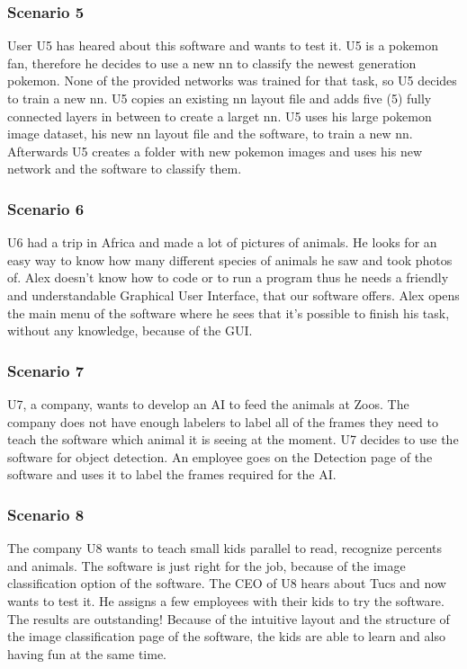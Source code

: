 \documentclass[parskip=full]{scrartcl}
\begin{document}
\subsubsection{Scenario 5}
User U5 has heared about this software and wants to test it.
U5 is a pokemon fan, therefore he decides to use a new \gls{nn} to classify the newest generation pokemon. None of the provided networks was trained for that task, so U5 decides to train a new \gls{nn}. U5 copies an existing \gls{nn} layout file and adds five (5) fully connected layers in between to create a larget \gls{nn}. U5 uses his large pokemon image dataset, his new \gls{nn} layout file and the software, to train a new \gls{nn}. 
Afterwards U5 creates a folder with new pokemon images and uses his new network and the software to classify them.
\subsubsection{Scenario 6}
U6 had a trip in Africa and made a lot of pictures of animals. He looks for an easy way to know how many different species of animals he saw and took photos of. Alex doesn't know how to code or to run a program thus he needs a friendly and understandable Graphical User Interface, that our software offers. Alex opens the main menu of the software where he sees that it's possible to finish his task, without any knowledge, because of the GUI. 
\subsubsection{Scenario 7}
U7, a company, wants to develop an AI to feed the animals at Zoos. The company does not have enough labelers to label all of the frames they need to teach the software which animal it is seeing at the moment. U7 decides to use the software for object detection. An employee goes on the Detection page of the software and uses it to label the frames required for the AI.
\clearpage
\subsubsection{Scenario 8}
The company U8 wants to teach small kids parallel to read, recognize percents and animals. The software is just right for the job, because of the \gls{image classification} option of the software. The CEO of U8 hears about Tucs and now wants to test it. He assigns a few employees with their kids to try the software. The results are outstanding! Because of the intuitive layout and the structure of the \gls{image classification} page of the software, the kids are able to learn and also having fun at the same time.
\clearpage
\end{document}
